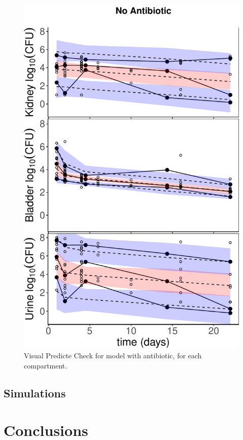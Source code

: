 \documentclass{article}
\begin{document}
\begin{figure}
	\centering
	\includegraphics[width=\linewidth]{images/plt_vpc_merged_Ct_ONLY.pdf}
	\caption{Visual Predicte Check for model with antibiotic, for each compartment.}
	\label{fig:ModelIndFits}
\end{figure}


\subsection{Simulations}


\section{Conclusions}
\end{document}
